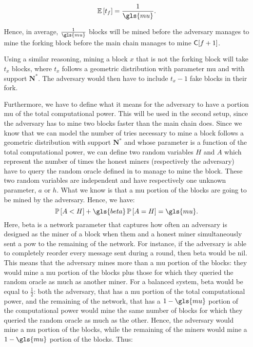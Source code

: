 \[\E{t_f}=\frac{1}{\gls{mu}}.\]

Hence, in average, \(\frac{1}{\gls{mu}}\) blocks will be mined before the adversary manages to mine the forking block before the main chain manages to mine \(\mathsf{C[}f+1\mathsf{]}\).

Using a similar reasoning, mining a block \(x\) that is not the forking block will take \(t_x\) blocks, where \(t_x\) follows a geometric distribution with parameter \gls{mu} and with support \(\mathbf{N}^*\). The adversary would then have to include \(t_x-1\) fake blocks in their fork.

Furthermore, we have to define what it means for the adversary to have a portion \gls{mu} of the total computational power. This will be used in the second setup, since the adversary has to mine two blocks faster than the main chain does. Since we know that we can model the number of tries necessary to mine a block follows a geometric distribution with support \(\mathbf{N}^*\) and whose parameter is a function of the total computational power, we can define two random variables \(H\) and \(A\) which represent the number of times the honest miners (respectively the adversary) have to query the random oracle defined in \cite{Backbone} to manage to mine the block. These two random variables are independent and have respectively one unknown parameter, \(a\) or \(h\). What we know is that a \gls{mu} portion of the blocks are going to be mined by the adversary. Hence, we have:
\[\P{A<H}+\gls{beta}\,\P{A=H}=\gls{mu}.\]
Here, \gls{beta} is a network parameter that captures how often an adversary is designed as the miner of a block when them and a honest miner simultaneously sent a \gls{pow} to the remaining of the network. For instance, if the adversary is able to completely reorder every message sent during a round, then \gls{beta} would be nil. This means that the adversary mines more than a \gls{mu} portion of the blocks: they would mine a \gls{mu} portion of the blocks plus those for which they queried the random oracle as much as another miner. For a balanced system, \gls{beta} would be equal to \(\frac12\): both the adversary, that has a \gls{mu} portion of the total computational power, and the remaining of the network, that has a \(1-\gls{mu}\) portion of the computational power would mine the same number of blocks for which they queried the random oracle as much as the other. Hence, the adversary would mine a \gls{mu} portion of the blocks, while the remaining of the miners would mine a \(1-\gls{mu}\) portion of the blocks.
Thus:
